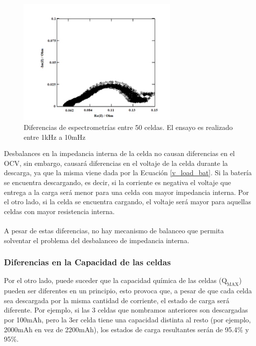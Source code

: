 \documentclass[10pt,a4paper]{article}
\begin{document}
	\begin{figure}[h!]
		\begin{center}
			\includegraphics[width=0.7\textwidth]{zin_diff.png}
			\caption{Diferencias de espectrometrías entre 50 celdas. El ensayo es realizado entre 1kHz a 10mHz}
			\label{zin_diff}
		\end{center}
	\end{figure}
	
	Desbalances en la impedancia interna de la celda no causan diferencias en el OCV, sin embargo, causará diferencias en el voltaje de la celda durante la descarga, ya que la misma viene dada por la Ecuación \ref{v_load_bat}. Si la batería se encuentra descargando, es decir, si la corriente es negativa el voltaje que entrega a la carga será menor para una celda con mayor impedancia interna. Por el otro lado, si la celda se encuentra cargando, el voltaje será mayor para aquellas celdas con mayor resistencia interna.\\
	\\
	A pesar de estas diferencias, no hay mecanismo de balanceo que permita solventar el problema del desbalanceo de impedancia interna.\\
	
	\subsubsection{Diferencias en la Capacidad de las celdas}
	
	Por el otro lado, puede suceder que la capacidad química de las celdas ($\mathrm{Q_{MAX}}$) pueden ser diferentes en un principio, esto provoca que, a pesar de que cada celda sea descargada por la misma cantidad de corriente, el estado de carga será diferente. Por ejemplo, si las 3 celdas que nombramos anteriores son descargadas por 100mAh, pero la 3er celda tiene una capacidad distinta al resto (por ejemplo, 2000mAh en vez de 2200mAh), los estados de carga resultantes serán de 95.4\% y 95\%.\\
	
\end{document}
